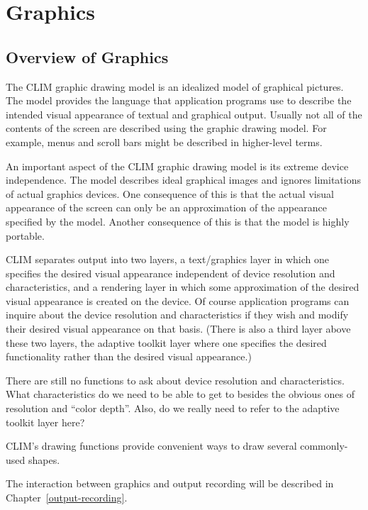 
\chapter {Graphics}
\label {graphics}

\section {Overview of Graphics}

The CLIM graphic drawing model is an idealized model of graphical pictures.  The
model provides the language that application programs use to describe the
intended visual appearance of textual and graphical output.  Usually not all of
the contents of the screen are described using the graphic drawing model.  For
example, menus and scroll bars might be described in higher-level terms.

An important aspect of the CLIM graphic drawing model is its extreme device
independence.  The model describes ideal graphical images and ignores
limitations of actual graphics devices.  One consequence of this is that the
actual visual appearance of the screen can only be an approximation of the
appearance specified by the model.  Another consequence of this is that the
model is highly portable.

CLIM separates output into two layers, a text/graphics layer in which one
specifies the desired visual appearance independent of device resolution and
characteristics, and a rendering layer in which some approximation of the
desired visual appearance is created on the device.  Of course application
programs can inquire about the device resolution and characteristics if they
wish and modify their desired visual appearance on that basis.  (There is also a
third layer above these two layers, the adaptive toolkit layer where one
specifies the desired functionality rather than the desired visual appearance.)

 {There are still no functions to ask about device resolution and
characteristics.  What characteristics do we need to be able to get to besides
the obvious ones of resolution and ``color depth''.  Also, do we really need to
refer to the adaptive toolkit layer here?}

CLIM's drawing functions provide convenient ways to draw several commonly-used
shapes.

The interaction between graphics and output recording will be described in
Chapter~\ref{output-recording}.


